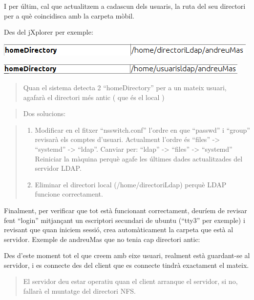 \documentclass[
  12 pt,
  a4paper,
]{article}
\begin{document}
I per últim, cal que actualitzem a cadascun dels usuaris, la ruta del
seu directori per a què coincidisca amb la carpeta mòbil.

Des del jXplorer per exemple:

\includegraphics{png/perfilmobil2.png}

\includegraphics{png/perfilmobil3.png}

\begin{quote}
Quan el sistema detecta 2 ``homeDirectory'' per a un mateix usuari,
agafarà el directori més antic ( que és el local )
\end{quote}

\begin{quote}
Dos solucions:
\end{quote}

\begin{quote}
\begin{enumerate}
\def\labelenumi{\arabic{enumi}.}
\item
  Modificar en el fitxer ``nsswitch.conf'' l'ordre en que ``passwd'' i
  ``group'' revisarà els comptes d'usuari. Actualment l'ordre és
  ``files'' -\textgreater{} ``systemd'' -\textgreater{} ``ldap''.
  Canviar per: ``ldap'' -\textgreater{} ``files'' -\textgreater{}
  ``systemd'' Reiniciar la màquina perquè agafe les últimes dades
  actualitzades del servidor LDAP.
\item
  Eliminar el directori local (/home/directoriLdap) perquè LDAP funcione
  correctament.
\end{enumerate}
\end{quote}

Finalment, per verificar que tot està funcionant correctament, deuríem
de revisar fent ``login'' mitjançant un escriptori secundari de ubuntu
(``tty3'' per exemple) i revisant que quan iniciem sessió, crea
automàticament la carpeta que està al servidor. Exemple de andreuMas que
no tenia cap directori antic:

Des d'este moment tot el que creem amb eixe usuari, realment està
guardant-se al servidor, i es connecte des del client que es connecte
tindrà exactament el mateix.

\begin{quote}
El servidor deu estar operatiu quan el client arranque el servidor, si
no, fallarà el muntatge del directori NFS.
\end{quote}
\end{document}
